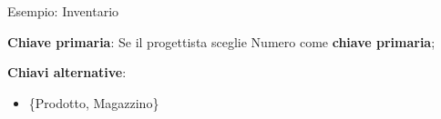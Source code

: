 %
\begin{frame}{Esempio: Inventario}
\vspace{-1cm}
\begin{center}
    \InventarioModified
\end{center}
\pause
\textbf{Chiave primaria}:
Se il progettista sceglie Numero come \textbf{chiave primaria};

\textbf{Chiavi alternative}:
\pause
\begin{itemize}[<+->]
    \item \{Prodotto, Magazzino\}
\end{itemize}
\end{frame}
%
